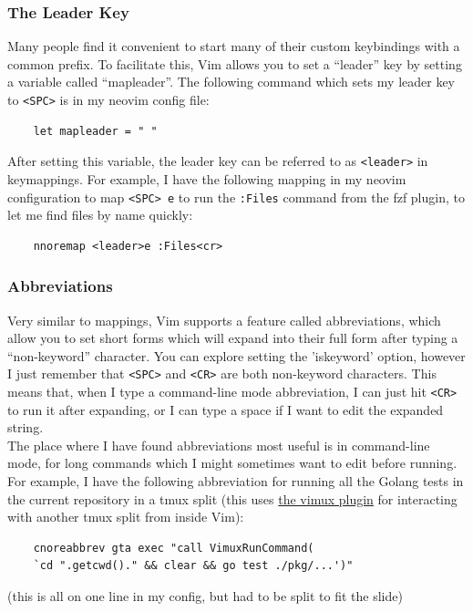 \documentclass{beamer}
\begin{document}
\begin{frame}[fragile]
    \frametitle{The Leader Key}
    \small
    Many people find it convenient to start many of their custom keybindings with a common prefix. To facilitate this, Vim allows you to set a \enquote{leader} key by setting a variable called \enquote{mapleader}. The following command which sets my leader key to \verb+<SPC>+ is in my neovim config file:\\
    \begin{verbatim}
    let mapleader = " "
    \end{verbatim}
    After setting this variable, the leader key can be referred to as \verb+<leader>+ in keymappings. For example, I have the following mapping in my neovim configuration to map \verb+<SPC> e+ to run the \verb+:Files+ command from the fzf plugin, to let me find files by name quickly:\\
    \begin{verbatim}
    nnoremap <leader>e :Files<cr>
    \end{verbatim}
\end{frame}

\begin{frame}[fragile]
    \frametitle{Abbreviations}
    \small
    Very similar to mappings, Vim supports a feature called abbreviations, which allow you to set short forms which will expand into their full form after typing a \enquote{non-keyword} character. You can explore setting the 'iskeyword' option, however I just remember that \verb+<SPC>+ and \verb+<CR>+ are both non-keyword characters. This means that, when I type a command-line mode abbreviation, I can just hit \verb+<CR>+ to run it after expanding, or I can type a space if I want to edit the expanded string.\\
    \vspace{0.5cm}
    The place where I have found abbreviations most useful is in command-line mode, for long commands which I might sometimes want to edit before running. For example, I have the following abbreviation for running all the Golang tests in the current repository in a tmux split (this uses \href{https://github.com/benmills/vimux}{the vimux plugin} for interacting with another tmux split from inside Vim):\\
    \begin{verbatim}
    cnoreabbrev gta exec "call VimuxRunCommand(
	`cd ".getcwd()." && clear && go test ./pkg/...')"
    \end{verbatim}
    (this is all on one line in my config, but had to be split to fit the slide)
\end{frame}
\end{document}

